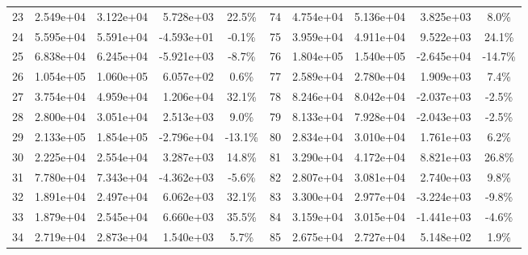 \begin{table}
\begin{tabular}{|c|r|r|r|c||c|r|r|r|c|}
        23          & 2.549e+04        & 3.122e+04      & 5.728e+03       & 22.5\%               & 74          & 4.754e+04        & 5.136e+04      & 3.825e+03       & 8.0\%                \\
        24          & 5.595e+04        & 5.591e+04      & -4.593e+01      & -0.1\%               & 75          & 3.959e+04        & 4.911e+04      & 9.522e+03       & 24.1\%               \\
        25          & 6.838e+04        & 6.245e+04      & -5.921e+03      & -8.7\%               & 76          & 1.804e+05        & 1.540e+05      & -2.645e+04      & -14.7\%              \\
        26          & 1.054e+05        & 1.060e+05      & 6.057e+02       & 0.6\%                & 77          & 2.589e+04        & 2.780e+04      & 1.909e+03       & 7.4\%                \\
        27          & 3.754e+04        & 4.959e+04      & 1.206e+04       & 32.1\%               & 78          & 8.246e+04        & 8.042e+04      & -2.037e+03      & -2.5\%               \\
        28          & 2.800e+04        & 3.051e+04      & 2.513e+03       & 9.0\%                & 79          & 8.133e+04        & 7.928e+04      & -2.043e+03      & -2.5\%               \\
        29          & 2.133e+05        & 1.854e+05      & -2.796e+04      & -13.1\%              & 80          & 2.834e+04        & 3.010e+04      & 1.761e+03       & 6.2\%                \\
        30          & 2.225e+04        & 2.554e+04      & 3.287e+03       & 14.8\%               & 81          & 3.290e+04        & 4.172e+04      & 8.821e+03       & 26.8\%               \\
        31          & 7.780e+04        & 7.343e+04      & -4.362e+03      & -5.6\%               & 82          & 2.807e+04        & 3.081e+04      & 2.740e+03       & 9.8\%                \\
        32          & 1.891e+04        & 2.497e+04      & 6.062e+03       & 32.1\%               & 83          & 3.300e+04        & 2.977e+04      & -3.224e+03      & -9.8\%               \\
        33          & 1.879e+04        & 2.545e+04      & 6.660e+03       & 35.5\%               & 84          & 3.159e+04        & 3.015e+04      & -1.441e+03      & -4.6\%               \\
        34          & 2.719e+04        & 2.873e+04      & 1.540e+03       & 5.7\%                & 85          & 2.675e+04        & 2.727e+04      & 5.148e+02       & 1.9\%                \\

\end{tabular}
\end{table}

